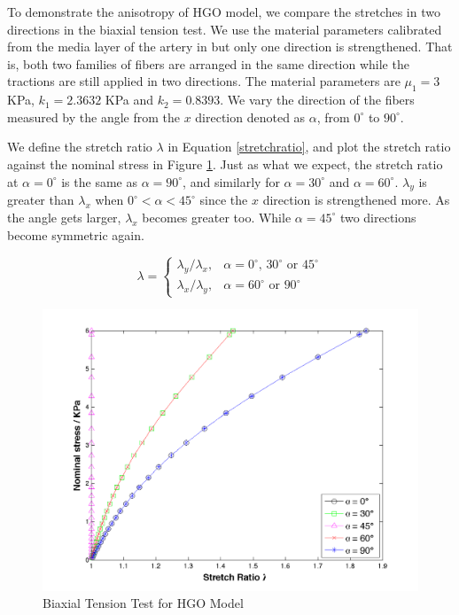 To demonstrate the anisotropy of HGO model, we compare the stretches in two directions in the biaxial tension test. We use the material parameters calibrated from the media layer of the artery in \cite{Holzapfel2} but only one direction is strengthened. That is, both two families of fibers are arranged in the same direction while the tractions are still applied in two directions. The material parameters are $\mu_1 = 3$ KPa, $k_1 = 2.3632$ KPa and $k_2 = 0.8393$. We vary the direction of the fibers measured by the angle from the $x$ direction denoted as $\alpha$, from $0^\circ$ to $90^\circ$. 

We define the stretch ratio $\lambda$ in Equation \ref{stretchratio}, and plot the stretch ratio against the nominal stress in Figure \ref{fig:biaxial2}. Just as what we expect, the stretch ratio at $\alpha = 0^\circ$ is the same as $\alpha = 90^\circ$, and similarly for $\alpha = 30^\circ$ and $\alpha = 60^\circ$. 
$\lambda_y$ is greater than $\lambda_x$ when $0^\circ < \alpha < 45^\circ$ since the $x$ direction is strengthened more. As the angle gets larger, $\lambda_x$ becomes greater too. While $\alpha = 45^\circ$ two directions become symmetric again.

\begin{equation}
\label{stretchratio}
\lambda = 
\begin{cases}
	\lambda_y/\lambda_x, & \text{$\alpha = 0^\circ$, $30^\circ$ or $45^\circ$} \\
	\lambda_x/\lambda_y, & \text{$\alpha = 60^\circ$ or $90^\circ$}
\end{cases}
\end{equation}
 
\begin{figure}[h!]
\centering
\includegraphics[width=.6\textwidth]{./figures/biaxial2.png}
\caption{Biaxial Tension Test for HGO Model}
\label{fig:biaxial2}
\end{figure}

